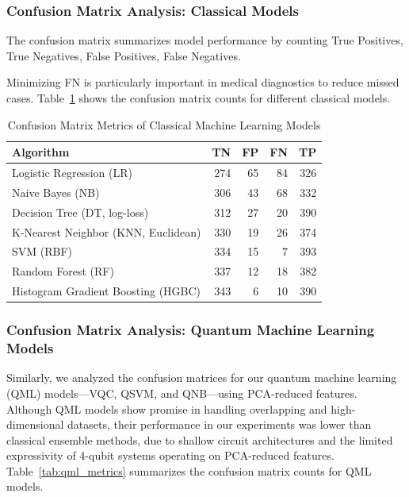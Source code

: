 \documentclass[runningheads]{llncs}
\begin{document}
\subsubsection{Confusion Matrix Analysis: Classical Models}
The confusion matrix summarizes model performance by counting 
True Positives, True Negatives, False Positives, False Negatives.

Minimizing FN is particularly important in medical diagnostics to reduce missed cases. Table~\ref{tab:algorithm_metrics} shows the confusion matrix counts for different classical models.  

\begin{table}[ht]
\centering
\caption{Confusion Matrix Metrics of Classical Machine Learning Models}
\label{tab:algorithm_metrics}
\begin{tabular}{lrrrr}
        \toprule
        \textbf{Algorithm} & \textbf{TN} & \textbf{FP} & \textbf{FN} & \textbf{TP} \\
        \midrule
        Logistic Regression (LR) & 274 & 65 & 84 & 326 \\
        Naive Bayes (NB) & 306 & 43 & 68 & 332 \\
        Decision Tree (DT, log-loss) & 312 & 27 & 20 & 390 \\
        K-Nearest Neighbor (KNN, Euclidean) & 330 & 19 & 26 & 374 \\
        SVM (RBF) & 334 & 15 & 7 & 393 \\
        Random Forest (RF) & 337 & 12 & 18 & 382 \\
        Histogram Gradient Boosting (HGBC) & 343 & 6 & 10 & 390 \\
        \bottomrule
\end{tabular}
\end{table}

\subsubsection{Confusion Matrix Analysis: Quantum Machine Learning Models}
Similarly, we analyzed the confusion matrices for our quantum machine learning (QML) models---VQC, QSVM, and QNB---using PCA-reduced features. Although QML models show promise in handling overlapping and high-dimensional datasets, their performance in our experiments was lower than classical ensemble methods, due to shallow circuit architectures and the limited expressivity of 4-qubit systems operating on PCA-reduced features. Table~\ref{tab:qml_metrics} summarizes the confusion matrix counts for QML models.
\end{document}
